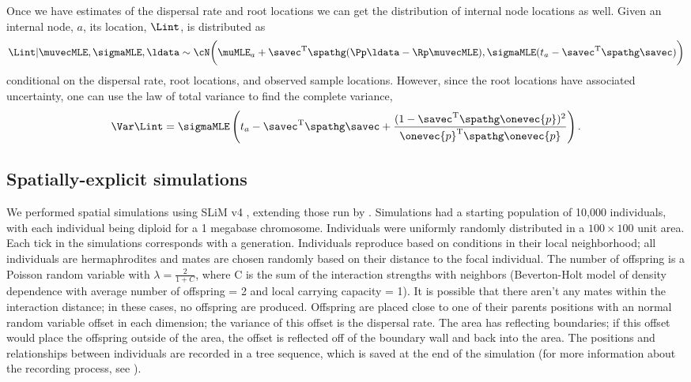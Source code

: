 Once we have estimates of the dispersal rate and root locations we can get the distribution of internal node locations as well. Given an internal node, $a$, its location, $\Lint$, is distributed as
\begin{eqnarray}
    \Lint | \muvecMLE, \sigmaMLE, \ldata \sim \cN \bigg( \muMLE_a + \savec^\text{T}\spathg(\Pp\ldata - \Rp \muvecMLE), \sigmaMLE(t_a - \savec^\text{T}\spathg\savec)\bigg)
\end{eqnarray}
conditional on the dispersal rate, root locations, and observed sample locations. However, since the root locations have associated uncertainty, one can use the law of total variance to find the complete variance,
\begin{eqnarray}
    \Var \Lint = \sigmaMLE\left(t_a - \savec^\text{T}\spathg\savec + \displaystyle \frac{(1 - \savec^\text{T}\spathg\onevec{p})^2}{\onevec{p}^\text{T}\spathg\onevec{p}}\right).
\end{eqnarray}



\subsection*{Spatially-explicit simulations}

We performed spatial simulations using SLiM v4 \citep{haller_slim_2023}, extending those run by \citet{osmond_estimating_2021}. Simulations had a starting population of 10,000 individuals, with each individual being diploid for a 1 megabase chromosome. Individuals were uniformly randomly distributed in a $100 \times 100$ unit area. Each tick in the simulations corresponds with a generation. Individuals reproduce based on conditions in their local neighborhood; all individuals are hermaphrodites and mates are chosen randomly based on their distance to the focal individual. The number of offspring is a Poisson random variable with $\lambda=\frac{2}{1 + C}$, where C is the sum of the interaction strengths with neighbors (Beverton-Holt model of density dependence with average number of offspring = 2 and local carrying capacity = 1). It is possible that there aren't any mates within the interaction distance; in these cases, no offspring are produced. Offspring are placed close to one of their parents positions with an normal random variable offset in each dimension; the variance of this offset is the dispersal rate. The area has reflecting boundaries; if this offset would place the offspring outside of the area, the offset is reflected off of the boundary wall and back into the area. The positions and relationships between individuals are recorded in a tree sequence, which is saved at the end of the simulation (for more information about the recording process, see \citet{haller_tree-sequence_2019}).

